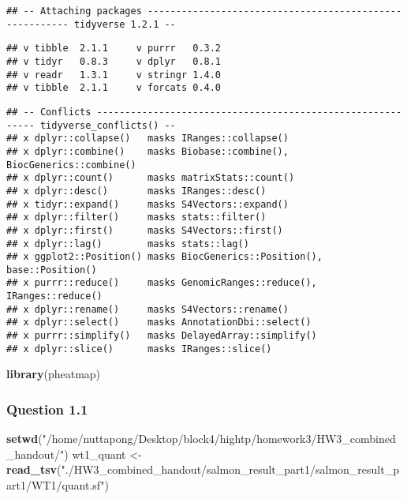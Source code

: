 \documentclass[]{article}
\newenvironment{Shaded}{\begin{snugshade}}{\end{snugshade}}
\newcommand{\KeywordTok}[1]{\textcolor[rgb]{0.13,0.29,0.53}{\textbf{#1}}}
\newcommand{\NormalTok}[1]{#1}
\newcommand{\StringTok}[1]{\textcolor[rgb]{0.31,0.60,0.02}{#1}}
\begin{document}
\begin{verbatim}
## -- Attaching packages -------------------------------------------------------- tidyverse 1.2.1 --
\end{verbatim}

\begin{verbatim}
## v tibble  2.1.1     v purrr   0.3.2
## v tidyr   0.8.3     v dplyr   0.8.1
## v readr   1.3.1     v stringr 1.4.0
## v tibble  2.1.1     v forcats 0.4.0
\end{verbatim}

\begin{verbatim}
## -- Conflicts ----------------------------------------------------------- tidyverse_conflicts() --
## x dplyr::collapse()   masks IRanges::collapse()
## x dplyr::combine()    masks Biobase::combine(), BiocGenerics::combine()
## x dplyr::count()      masks matrixStats::count()
## x dplyr::desc()       masks IRanges::desc()
## x tidyr::expand()     masks S4Vectors::expand()
## x dplyr::filter()     masks stats::filter()
## x dplyr::first()      masks S4Vectors::first()
## x dplyr::lag()        masks stats::lag()
## x ggplot2::Position() masks BiocGenerics::Position(), base::Position()
## x purrr::reduce()     masks GenomicRanges::reduce(), IRanges::reduce()
## x dplyr::rename()     masks S4Vectors::rename()
## x dplyr::select()     masks AnnotationDbi::select()
## x purrr::simplify()   masks DelayedArray::simplify()
## x dplyr::slice()      masks IRanges::slice()
\end{verbatim}

\begin{Shaded}
\begin{Highlighting}[]
\KeywordTok{library}\NormalTok{(pheatmap)}
\end{Highlighting}
\end{Shaded}

\hypertarget{question-1.1}{%
\subsubsection{Question 1.1}\label{question-1.1}}

\begin{Shaded}
\begin{Highlighting}[]
\KeywordTok{setwd}\NormalTok{(}\StringTok{"/home/nuttapong/Desktop/block4/hightp/homework3/HW3_combined_handout/"}\NormalTok{)}
\NormalTok{wt1_quant <-}\StringTok{ }\KeywordTok{read_tsv}\NormalTok{(}\StringTok{"./HW3_combined_handout/salmon_result_part1/salmon_result_part1/WT1/quant.sf"}\NormalTok{)}
\end{Highlighting}
\end{Shaded}
\end{document}
